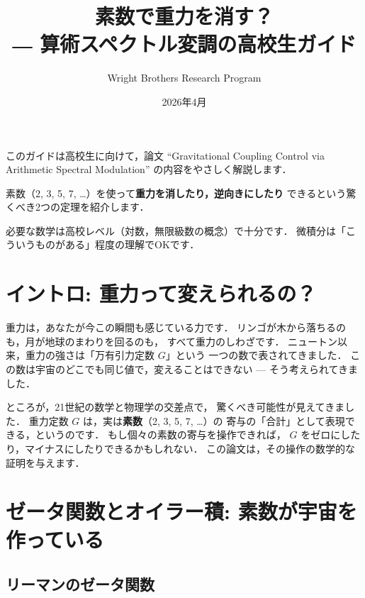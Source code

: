 \documentclass[11pt,a4paper]{article}
\title{素数で重力を消す？\\
\large ― 算術スペクトル変調の高校生ガイド}
\author{Wright Brothers Research Program}
\date{2026年4月}
\begin{document}
\maketitle

\begin{tcolorbox}[colback=yellow!5,colframe=orange!60!black,title=このガイドについて]
このガイドは高校生に向けて，論文
``Gravitational Coupling Control via Arithmetic Spectral Modulation''
の内容をやさしく解説します．

素数（2, 3, 5, 7, \ldots）を使って\textbf{重力を消したり，逆向きにしたり}
できるという驚くべき2つの定理を紹介します．

必要な数学は高校レベル（対数，無限級数の概念）で十分です．
微積分は「こういうものがある」程度の理解でOKです．
\end{tcolorbox}

\tableofcontents

\newpage

\section{イントロ: 重力って変えられるの？}

重力は，あなたが今この瞬間も感じている力です．
リンゴが木から落ちるのも，月が地球のまわりを回るのも，
すべて重力のしわざです．
ニュートン以来，重力の強さは「万有引力定数 $G$」という
一つの数で表されてきました．
この数は宇宙のどこでも同じ値で，変えることはできない
--- そう考えられてきました．

ところが，21世紀の数学と物理学の交差点で，
驚くべき可能性が見えてきました．
重力定数 $G$ は，実は\textbf{素数}（2, 3, 5, 7, \ldots）の
寄与の「合計」として表現できる，というのです．
もし個々の素数の寄与を操作できれば，
$G$ をゼロにしたり，マイナスにしたりできるかもしれない．
この論文は，その操作の数学的な証明を与えます．

\section{ゼータ関数とオイラー積: 素数が宇宙を作っている}

\subsection{リーマンのゼータ関数}
\end{document}
